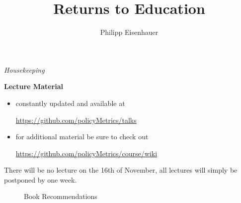 

\title{Returns to Education}
\author{Philipp Eisenhauer}

\date{}

\let\otp\titlepage


\maketitle
\begin{frame}\begin{center}
\LARGE\textit{Housekeeping}
\end{center}\end{frame}

\begin{frame}
\textbf{Lecture Material}
\begin{itemize}
\item constantly updated and available at\vspace{0.2cm}
\begin{center}\url{https://github.com/policyMetrics/talks}\end{center}\vspace{0.2cm}
\item for additional material be sure to check out \vspace{0.2cm}
\begin{center}\url{https://github.com/policyMetrics/course/wiki}\end{center}
\end{itemize}

\end{frame}

\begin{frame}
There will be no lecture on the 16th of November, all lectures will simply be postponed by one week.
\end{frame}

\begin{frame}
\begin{figure}
\caption{Book Recommendations}
\hspace{0.5cm}
\end{figure}
\end{frame}


